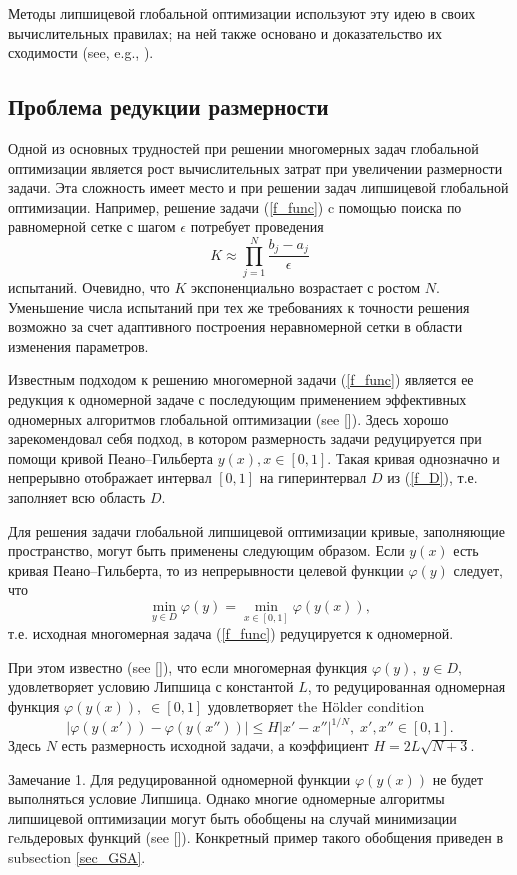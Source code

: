 \documentclass[preprint,12pt]{elsarticle}
\begin{document}
Методы липшицевой глобальной оптимизации используют эту идею в своих вычислительных правилах; на ней также основано и доказательство их сходимости (see, e.g., ).

\subsection{Проблема редукции размерности} 

Одной из основных трудностей при решении многомерных задач глобальной оптимизации является рост вычислительных затрат при увеличении размерности задачи. Эта сложность имеет место и при решении задач липшицевой глобальной оптимизации.
Например, решение задачи (\ref{f_func}) c помощью поиска по равномерной сетке с шагом $\epsilon$ потребует проведения 
\[
K \approx \prod_{j=1}^N{\frac{b_j-a_j}{\epsilon}}
\]
испытаний. Очевидно, что $K$ экспоненциально возрастает с ростом $N$.
Уменьшение числа испытаний при тех же требованиях к точности решения возможно за счет адаптивного построения неравномерной сетки в области изменения параметров.

Известным подходом к решению многомерной задачи (\ref{f_func}) является ее редукция к одномерной задаче с последующим применением эффективных одномерных алгоритмов глобальной оптимизации (see []). Здесь хорошо зарекомендовал себя подход, в котором размерность задачи редуцируется при помощи кривой Пеано–Гильберта $y(x), x \in [0, 1]$.
Такая кривая однозначно и непрерывно отображает интервал $[0, 1]$ на гиперинтервал $D$ из (\ref{f_D}), т.е. заполняет всю область $D$.

Для решения задачи глобальной липшицевой оптимизации кривые, заполняющие пространство, могут быть применены следующим образом.
Если $y(x)$ есть кривая Пеано–Гильберта, то из непрерывности целевой функции $\varphi(y)$ следует, что
\[
\min_{y \in D } \varphi(y) = \min_{x \in [0,1] } \varphi(y(x)),
\]
т.е. исходная многомерная задача (\ref{f_func}) редуцируется к одномерной.


При этом известно (see []), что если многомерная функция $\varphi(y), \; y \in D,$  удовлетворяет условию Липшица с константой $L$, то редуцированная одномерная функция $\varphi(y(x)), \; \in [0,1]$ удовлетворяет the H{\"o}lder condition
\[
\left|\varphi(y(x'))-\varphi(y(x''))\right|\leq H\left|x'-x''\right|^{1/N}, \; x',x''\in[0,1].
\]
Здесь $N$ есть размерность исходной задачи, а коэффициент $ H=2 L \sqrt{N+3}$.

Замечание 1. Для редуцированной одномерной функции $\varphi(y(x))$  не будет выполняться условие Липшица. Однако многие одномерные алгоритмы липшицевой оптимизации
могут быть обобщены на случай минимизации гeльдеровых функций (see []). Конкретный пример такого обобщения приведен в subsection \ref{sec_GSA}. 
\end{document}
